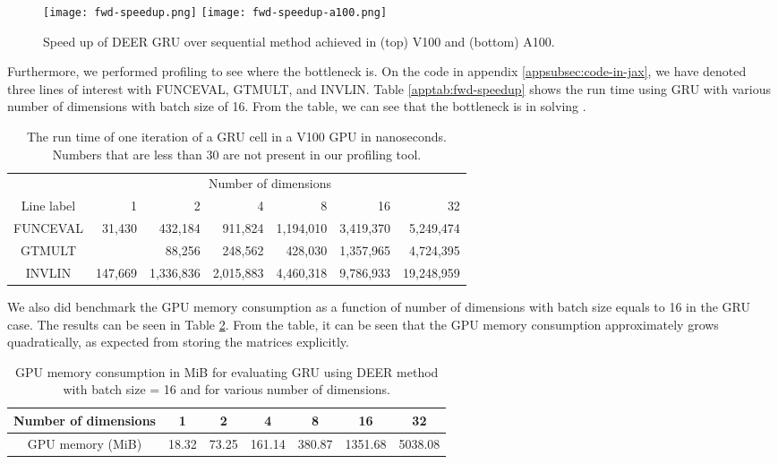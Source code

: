 \begin{figure}
    \centering
    \texttt{[image: fwd-speedup.png]}
    \texttt{[image: fwd-speedup-a100.png]}
    \caption{Speed up of DEER GRU over sequential method achieved in (top) V100 and (bottom) A100.}
    \label{appfig:V100-vs-A100-speed-up}
\end{figure}

Furthermore, we performed profiling to see where the bottleneck is.
On the code in appendix \ref{appsubsec:code-in-jax}, we have denoted three lines of interest with FUNCEVAL, GTMULT, and INVLIN.
Table \ref{apptab:fwd-speedup} shows the run time using GRU with various number of dimensions with batch size of 16.
From the table, we can see that the bottleneck is in solving .

\begin{table}
    \centering
    \caption{The run time of one iteration of a GRU cell in a V100 GPU in nanoseconds.
    Numbers that are less than 30  are not present in our profiling tool. }
    \label{apptab:profiling}
    \begin{tabular}{|c|rrrrrr|}
        \hline
        ~ & ~ & \multicolumn{4}{c}{Number of dimensions} & ~ \\
        Line label & 1 & 2 & 4 & 8 & 16 & 32 \\
        \hline
        FUNCEVAL & 31,430 & 432,184 & 911,824 & 1,194,010 & 3,419,370 & 5,249,474 \\
        GTMULT & ~ & 88,256  &  248,562  &  428,030  & 1,357,965 & 4,724,395 \\
        INVLIN & 147,669 & 1,336,836 & 2,015,883 & 4,460,318 & 9,786,933 & 19,248,959 \\
        \hline
    \end{tabular}
\end{table}

We also did benchmark the GPU memory consumption as a function of number of dimensions with batch size equals to 16 in the GRU case.
The results can be seen in Table \ref{apptab:gpu-memory-consumption}.
From the table, it can be seen that the GPU memory consumption approximately grows quadratically, as expected from storing the matrices  explicitly.

\begin{table}[]
    \caption{GPU memory consumption in MiB for evaluating GRU using DEER method with batch size = 16 and for various number of dimensions.\\}
    \label{apptab:gpu-memory-consumption}
    \centering
    \begin{tabular}{c|cccccc}
        \hline
        Number of dimensions & 1 & 2 & 4 & 8 & 16 & 32 \\
        \hline
        GPU memory (MiB) & 18.32 & 73.25 & 161.14 & 380.87 & 1351.68 & 5038.08 \\
        \hline
    \end{tabular}
\end{table}